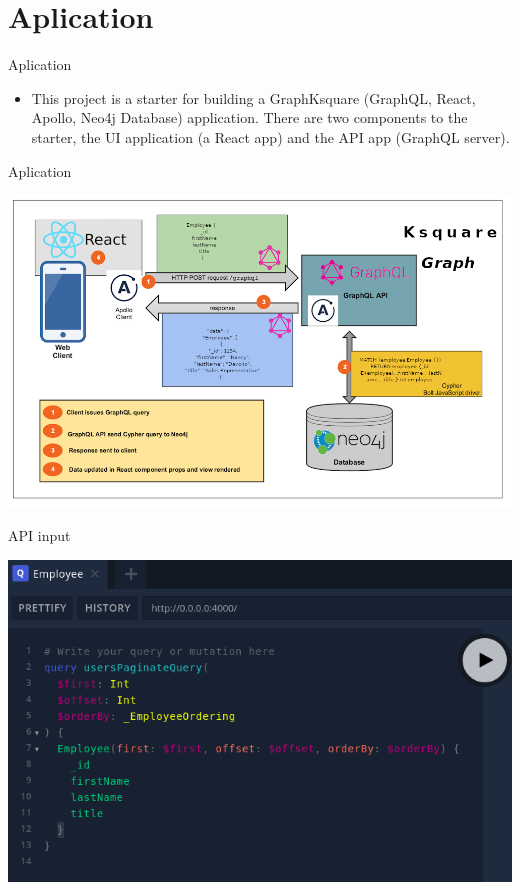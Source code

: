 \documentclass{beamer}
\begin{document}
\section{Aplication}

\begin{frame}{Aplication}{ }
\begin{itemize}
	\item This project is a starter for building a GraphKsquare (GraphQL, React, Apollo, Neo4j Database) application. There are two components to the starter, the UI application (a React app) and the API app (GraphQL server).
\end{itemize}
\end{frame}

\begin{frame}{Aplication}{ }

\begin{center}
	\includegraphics[width=0.7\linewidth]{img/neoapographqla.png}
\end{center}
\end{frame}


\begin{frame}{API input}{ }

\begin{center}
	\includegraphics[width=0.7\linewidth]{img/graphqlinput.png}
\end{center}
\end{frame}
\end{document}
